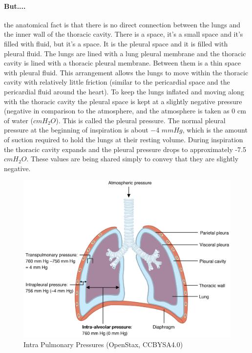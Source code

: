 \paragraph{But....} the anatomical fact is that there is no direct connection between the lungs and the inner wall of the thoracic cavity. There is a space, it's a small space and it's filled with fluid, but it's a space. It is the pleural space and it is filled with pleural fluid. The lungs are lined with a lung pleural membrane and the thoracic cavity is lined with a thoracic pleural membrane. Between them is a thin space with pleural fluid. This arrangement allows the lungs to move within the thoracic cavity with relatively little friction (similar to the pericardial space and the pericardial fluid around the heart). 
To keep the lungs inflated and moving along with the thoracic cavity the pleural space is kept at a slightly negative pressure (negative in comparison to the atmosphere, and the atmosphere is taken as 0 cm of water ($cm H_2O$)\footnotemark{}. This is called the pleural pressure. The normal pleural pressure at the beginning of inspiration is about −4 $mmHg$, which is the amount of suction required to hold the lungs at their resting volume. During inspiration the thoracic cavity expands and the pleural pressure drops to approximately -7.5 $cm H_2O$. These values are being shared simply to convey that they are slightly negative. 

\begin{figure}
    \centering
    \includegraphics[width = 0.4 \linewidth]{./figure/ventilation/intrapulmonaryPressures.jpg}
    \caption{Intra Pulmonary Pressures \footnotesize{(OpenStax, CCBYSA4.0)}}
    \label{fig:intrapulmonaryPressures}
\end{figure}

